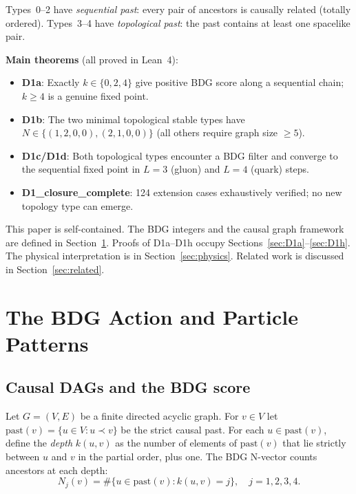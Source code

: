 \documentclass[11pt,a4paper]{article}
\begin{document}
Types~0--2 have \emph{sequential past}: every pair of ancestors is causally
related (totally ordered). Types~3--4 have \emph{topological past}: the
past contains at least one spacelike pair.

\medskip\noindent
\textbf{Main theorems} (all proved in Lean~4):
\begin{itemize}[noitemsep]
  \item \textbf{D1a}: Exactly $k \in \{0,2,4\}$ give positive BDG score
    along a sequential chain; $k \geq 4$ is a genuine fixed point.
  \item \textbf{D1b}: The two minimal topological stable types have
    $N \in \{(1,2,0,0),(2,1,0,0)\}$ (all others require graph size $\geq 5$).
  \item \textbf{D1c/D1d}: Both topological types encounter a BDG filter
    and converge to the sequential fixed point in $L=3$ (gluon) and
    $L=4$ (quark) steps.
  \item \textbf{D1\_closure\_complete}: 124 extension cases exhaustively
    verified; no new topology type can emerge.
\end{itemize}

This paper is self-contained. The BDG integers and the causal graph
framework are defined in Section~\ref{sec:bdg}. Proofs of D1a--D1h
occupy Sections~\ref{sec:D1a}--\ref{sec:D1h}. The physical
interpretation is in Section~\ref{sec:physics}. Related work is
discussed in Section~\ref{sec:related}.

\section{The BDG Action and Particle Patterns}
\label{sec:bdg}

\subsection{Causal DAGs and the BDG score}

Let $G = (V, E)$ be a finite directed acyclic graph. For $v \in V$
let $\mathrm{past}(v) = \{u \in V : u \prec v\}$ be the strict causal
past. For each $u \in \mathrm{past}(v)$, define the \emph{depth}
$k(u,v)$ as the number of elements of $\mathrm{past}(v)$ that lie
strictly between $u$ and $v$ in the partial order, plus one. The BDG
N-vector counts ancestors at each depth:
\[
  N_j(v) = \#\{u \in \mathrm{past}(v) : k(u,v) = j\}, \quad j=1,2,3,4.
\]
\end{document}
